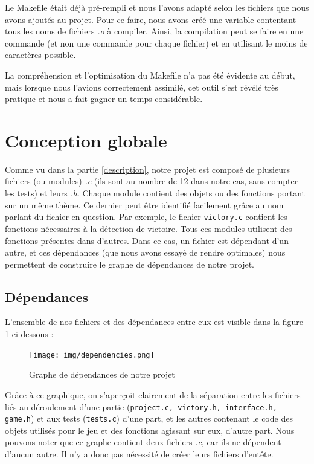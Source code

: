 \documentclass[a4paper]{article}
\begin{document}
Le Makefile était déjà pré-rempli et nous l'avons adapté selon les fichiers que nous avons ajoutés au projet. Pour ce faire, nous avons créé une variable contentant tous les noms de fichiers \emph{.o} à compiler. Ainsi, la compilation peut se faire en une commande (et non une commande pour chaque fichier) et en utilisant le moins de caractères possible.

La compréhension et l'optimisation du Makefile n'a pas été évidente au début, mais lorsque nous l'avions correctement assimilé, cet outil s'est révélé très pratique et nous a fait gagner un temps considérable.

\newpage

\section{Conception globale}
\label{conception}

Comme vu dans la partie \ref{description}, notre projet est composé de plusieurs fichiers (ou modules) \emph{.c} (ils sont au nombre de 12 dans notre cas, sans compter les tests) et leurs \emph{.h}. Chaque module contient des objets ou des fonctions portant sur un même thème. Ce dernier peut être identifié facilement grâce au nom parlant du fichier en question. Par exemple, le fichier \verb|victory.c| contient les fonctions nécessaires à la détection de victoire. Tous ces modules utilisent des fonctions présentes dans d'autres. Dans ce cas, un fichier est dépendant d'un autre, et ces dépendances (que nous avons essayé de rendre optimales) nous permettent de construire le graphe de dépendances de notre projet.

\subsection{Dépendances}
\label{dep}

L'ensemble de nos fichiers et des dépendances entre eux est visible dans la figure \ref{fig:dep} ci-dessous :

\begin{center}
\begin{figure}[H]
    \centering
    \texttt{[image: img/dependencies.png]}~\\[0.5 cm]
    \caption{Graphe de dépendances de notre projet}
    \label{fig:dep}
\end{figure}
\end{center}

Grâce à ce graphique, on s'aperçoit clairement de la séparation entre les fichiers liés au déroulement d'une partie (\verb|project.c, victory.h, interface.h, game.h|) et aux tests (\verb|tests.c|) d'une part, et les autres contenant le code des objets utilisés pour le jeu et des fonctions agissant sur eux, d'autre part. Nous pouvons noter que ce graphe contient deux fichiers \emph{.c}, car ils ne dépendent d'aucun autre. Il n'y a donc pas nécessité de créer leurs fichiers d'entête.
\end{document}
